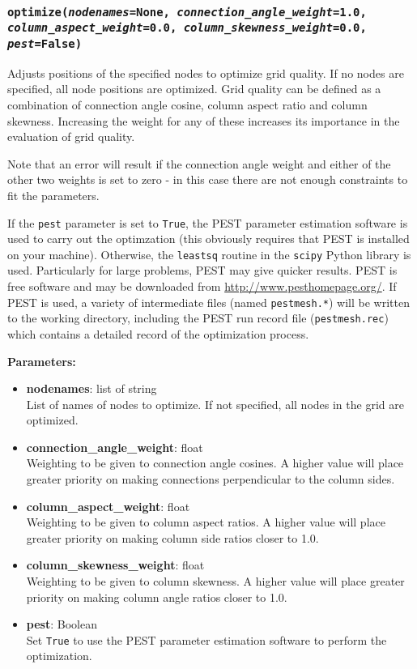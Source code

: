 \begin{snugshade}
\subsubsection{\texttt{optimize(\emph{nodenames}=None, \emph{connection\_angle\_weight}=1.0,\\
    \emph{column\_aspect\_weight}=0.0, \emph{column\_skewness\_weight}=0.0, \emph{pest}=False)}}\end{snugshade}
\label{sec:mulgrid:optimize}

Adjusts positions of the specified nodes to optimize grid quality.  If no nodes are specified, all node positions are optimized.  Grid quality can be defined as a combination of connection angle cosine, column aspect ratio and column skewness.  Increasing the weight for any of these increases its importance in the evaluation of grid quality.

Note that an error will result if the connection angle weight and either of the other two weights is set to zero - in this case there are not enough constraints to fit the parameters.

If the \texttt{pest} parameter is set to \texttt{True}, the PEST parameter estimation software is used to carry out the optimzation (this obviously requires that PEST is installed on your machine).  Otherwise, the \texttt{leastsq} routine in the \texttt{scipy} Python library is used.  Particularly for large problems, PEST may give quicker results.  PEST is free software and may be downloaded from \url{http://www.pesthomepage.org/}.  If PEST is used, a variety of intermediate files (named \texttt{pestmesh.*}) will be written to the working directory, including the PEST run record file (\texttt{pestmesh.rec}) which contains a detailed record of the optimization process.

\textbf{Parameters:}
\begin{itemize}
\item \textbf{nodenames}: list of string\\
  List of names of nodes to optimize.  If not specified, all nodes in the grid are optimized.
\item \textbf{connection\_angle\_weight}: float\\
  Weighting to be given to connection angle cosines.  A higher value will place greater priority on making connections perpendicular to the column sides.
\item \textbf{column\_aspect\_weight}: float\\
  Weighting to be given to column aspect ratios.  A higher value will place greater priority on making column side ratios closer to 1.0.
\item \textbf{column\_skewness\_weight}: float\\
  Weighting to be given to column skewness.  A higher value will place greater priority on making column angle ratios closer to 1.0.
\item \textbf{pest}: Boolean\\
  Set \texttt{True} to use the PEST parameter estimation software to perform the optimization.
\end{itemize}

